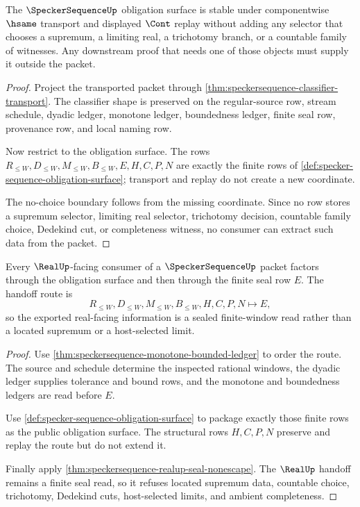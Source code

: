 \begin{theorem}
\label{thm:specker-sequence-no-choice-boundary}
The $\SpeckerSequenceUp$ obligation surface is stable under componentwise $\hsame$ transport and displayed $\Cont$ replay without adding any selector that chooses a supremum, a limiting real, a trichotomy branch, or a countable family of witnesses. Any downstream proof that needs one of those objects must supply it outside the packet.
\end{theorem}
\begin{proof}
Project the transported packet through \autoref{thm:speckersequence-classifier-transport}. The classifier shape is preserved on the regular-source row, stream schedule, dyadic ledger, monotone ledger, boundedness ledger, finite seal row, provenance row, and local naming row.

Now restrict to the obligation surface. The rows $R_{\leq W},D_{\leq W},M_{\leq W},B_{\leq W},E,H,C,P,N$ are exactly the finite rows of \autoref{def:specker-sequence-obligation-surface}; transport and replay do not create a new coordinate.

The no-choice boundary follows from the missing coordinate. Since no row stores a supremum selector, limiting real selector, trichotomy decision, countable family choice, Dedekind cut, or completeness witness, no consumer can extract such data from the packet.
\end{proof}

\begin{theorem}
\label{thm:specker-sequence-real-handoff}
Every $\RealUp$-facing consumer of a $\SpeckerSequenceUp$ packet factors through the obligation surface and then through the finite seal row $E$. The handoff route is
$$
R_{\leq W},D_{\leq W},M_{\leq W},B_{\leq W},H,C,P,N\longmapsto E,
$$
so the exported real-facing information is a sealed finite-window read rather than a located supremum or a host-selected limit.
\end{theorem}
\begin{proof}
Use \autoref{thm:speckersequence-monotone-bounded-ledger} to order the route. The source and schedule determine the inspected rational windows, the dyadic ledger supplies tolerance and bound rows, and the monotone and boundedness ledgers are read before $E$.

Use \autoref{def:specker-sequence-obligation-surface} to package exactly those finite rows as the public obligation surface. The structural rows $H,C,P,N$ preserve and replay the route but do not extend it.

Finally apply \autoref{thm:speckersequence-realup-seal-nonescape}. The $\RealUp$ handoff remains a finite seal read, so it refuses located supremum data, countable choice, trichotomy, Dedekind cuts, host-selected limits, and ambient completeness.
\end{proof}

